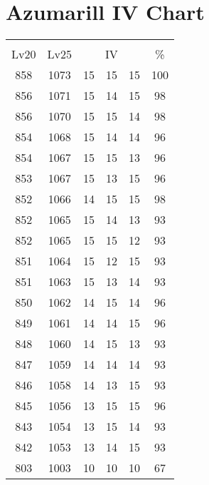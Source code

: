 \documentclass{article}%
\begin{document}
%
\normalsize%
\section{Azumarill IV Chart}%
\label{sec:Azumarill IV Chart}%
\renewcommand{\arraystretch}{1.5}%
\begin{tabular}{|c|c|c|c|c|c|}%
\hline%
\multicolumn{6}{|c|}{\textcolor{white}{ 
\linebreak{Azumarill}
}%
\cellcolor{black}}\\%
\multicolumn{1}{|c}{Lv20}&\multicolumn{1}{c|}{Lv25}&\multicolumn{3}{c|}{IV}&\multicolumn{1}{|c|}{\%}\\%
\hline%
\rowcolor{color100}%
858&1073&15&15&15&100\\%
\hline%
\rowcolor{color98}%
856&1071&15&14&15&98\\%
\hline%
\rowcolor{color98}%
856&1070&15&15&14&98\\%
\hline%
\rowcolor{color96}%
854&1068&15&14&14&96\\%
\hline%
\rowcolor{color96}%
854&1067&15&15&13&96\\%
\hline%
\rowcolor{color96}%
853&1067&15&13&15&96\\%
\hline%
\rowcolor{color98}%
852&1066&14&15&15&98\\%
\hline%
\rowcolor{color93}%
852&1065&15&14&13&93\\%
\hline%
\rowcolor{color93}%
852&1065&15&15&12&93\\%
\hline%
\rowcolor{color93}%
851&1064&15&12&15&93\\%
\hline%
\rowcolor{color93}%
851&1063&15&13&14&93\\%
\hline%
\rowcolor{color96}%
850&1062&14&15&14&96\\%
\hline%
\rowcolor{color96}%
849&1061&14&14&15&96\\%
\hline%
\rowcolor{color93}%
848&1060&14&15&13&93\\%
\hline%
\rowcolor{color93}%
847&1059&14&14&14&93\\%
\hline%
\rowcolor{color93}%
846&1058&14&13&15&93\\%
\hline%
\rowcolor{color96}%
845&1056&13&15&15&96\\%
\hline%
\rowcolor{color93}%
843&1054&13&15&14&93\\%
\hline%
\rowcolor{color93}%
842&1053&13&14&15&93\\%
\hline%
\rowcolor{color91}%
803&1003&10&10&10&67\\%
\end{tabular}

%
\end{document}
